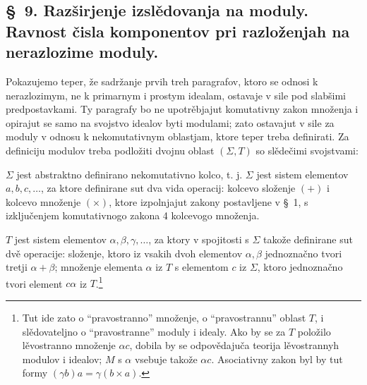 \documentclass[11pt]{article}
\begin{document}

\setcounter{footnote}{33}
\subsection*{\S~9. Razširjenje izslědovanja na moduly. Ravnost čisla komponentov pri razloženjah na nerazlozime moduly.}

Pokazujemo teper, že sadržanje prvih treh paragrafov, ktoro se odnosi k nerazlozimym, ne k primarnym i prostym idealam, ostavaje v sile pod slabšimi predpostavkami. Ty paragrafy bo ne upotrěbjajut komutativny zakon množenja i opirajut se samo na svojstvo idealov byti modulami; zato ostavajut v sile za moduly v odnosu k nekomutativnym oblastjam, ktore teper treba definirati. Za definiciju modulov treba podložiti dvojnu oblast \((\Sigma,T)\) so slědečimi svojstvami:

\(\Sigma\) jest abstraktno definirano nekomutativno kolco, t. j. \(\Sigma\) jest sistem elementov \(a,b,c,\ldots\), za ktore definirane sut dva vida operacij: kolcevo složenje \((+)\) i kolcevo množenje \((\times)\), ktore izpolnjajut zakony postavljene v \S~1, s izključenjem komutativnogo zakona 4 kolcevogo množenja.

\(T\) jest sistem elementov \(\alpha,\beta,\gamma,\ldots\), za ktory v spojitosti s \(\Sigma\) takože definirane sut dvě operacije: složenje, ktoro iz vsakih dvoh elementov \(\alpha,\beta\) jednoznačno tvori tretji \(\alpha+\beta\); množenje elementa \(\alpha\) iz \(T\) s elementom \(c\) iz \(\Sigma\), ktoro jednoznačno tvori element \(c\alpha\) iz \(T\).\footnote{Tut ide zato o ``pravostranno'' množenje, o ``pravostrannu'' oblast \(T\), i slědovateljno o ``pravostranne'' moduly i idealy. Ako by se za \(T\) položilo lěvostranno množenje \(\alpha c\), dobila by se odpovědajuča teorija lěvostrannyh modulov i idealov; \(M\) s \(\alpha\) vsebuje takože \(\alpha c\). Asociativny zakon byl by tut formy \((\gamma b)a=\gamma(b\times a)\).}
\end{document}
